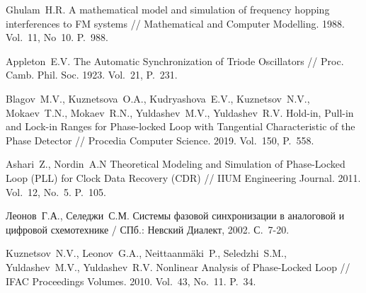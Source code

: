 \documentclass[a4paper,14pt]{article} %
\theoremstyle{cited}
\begin{document}
\begin{thebibliography}{20}
 Ghulam~H.\:R. A mathematical model and simulation of frequency hopping interferences to FM systems // Mathematical and Computer Modelling. 1988. Vol.~11, No~10. P.~988.

 Appleton~E.\:V. The Automatic Synchronization of Triode Oscillators // Proc. Camb. Phil. Soc. 1923. Vol.~21, P.~231.

 Blagov~M.\:V., Kuznetsova~O.\:A., Kudryashova~E.\:V., Kuznetsov~N.\:V., Mokaev~T.\:N., Mokaev~R.\:N., Yuldashev~M.\:V., Yuldashev~R.\:V. Hold-in, Pull-in and Lock-in Ranges for Phase-locked Loop with Tangential Characteristic of the Phase Detector // Procedia Computer Science. 2019.
Vol.~150, P.~558.

Ashari~Z., Nordin~A.\:N Theoretical Modeling and Simulation of Phase-Locked Loop (PLL) for Clock Data Recovery (CDR) // IIUM Engineering Journal. 2011. Vol.~12, No.~5. P.~105.

Леонов~Г.\:А., Селеджи~С.\:М. Системы фазовой синхронизации в аналоговой и цифровой схемотехнике / СПб.: Невский Диалект, 2002. С.~7-20.

Kuznetsov~N.\:V., Leonov~G.\:A., Neittaanmäki~P., Seledzhi~S.\:M., Yuldashev~M.\:V., Yuldashev~R.\:V. Nonlinear Analysis of Phase-Locked Loop // IFAC Proceedings Volumes. 2010. Vol.~43, No.~11. P.~34.

\end{thebibliography}
\end{document}
